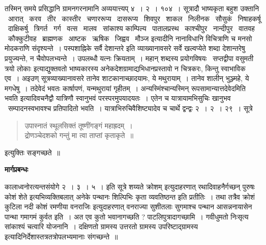 \documentclass[11pt, openany]{book}
\begin{document}
{तस्मिन् समये प्रसिद्धानि ग्रामनगरनामानि अव्ययात्त्यप् ४~। २~। १०४~। सूत्रादौ भाष्यकृता बहुश उक्तानि \textendash\ आरात् \textendash\ करव \textendash\ तीर \textendash\ कास्तीर \textendash\ चणाररूप्य \textendash\ दासरूप्य \textendash\ शिवपुर \textendash\ शाकल \textendash\ निलीनक \textendash\ सौसुकं \textendash\ निषाहकर्षू \textendash\ दाक्षिकर्षु \textendash\ त्रिगर्त \textendash\ गर्ग \textendash\ वत्स \textendash\ मालव \textendash\ सांकाश्य काम्पिल्य \textendash\ पातालप्रस्थ \textendash\ काश्चीपुर \textendash\ नान्दीपुर \textendash\ वातवह \textendash\ कौक्कुटीवह \textendash\ ब्राह्मणक \textendash\ आष्टक \textendash\ ऋषिक \textendash\ जिह्वव \textendash\ मौञ्ज इत्यादीनि नानाविधानि विचित्राणि च मनसो मोदकराणि संदृश्यन्ते~। पस्पशाह्निके {\qt सर्वै देशान्तरे} इति व्याख्यानावसरे सर्वे खल्वप्येते शब्दा देशान्तरेषु प्रयुज्यन्ते, न चैवोपलभ्यन्ते~। उपलब्धौ यत्नः क्रियताम्~। महान् शब्दस्य प्रयोगविषयः \textendash\ सप्तद्वीपा वसुमती त्रयो लोकाः} इत्याद्युक्तवतो भाष्यकारस्य अनेकदेशग्रामाद्यभिधानप्रस्तावो न चित्रकरः, किन्तु स्वाभाविक एव~। अइउण् सूत्रव्याख्यानावसरे {\qt तानेव शाटकानाच्छादयामः, ये मथुरायाम्~। तानेव शालीन् भुञ्ज्महे, ये मगधेषु~। तदेवेदं भवतः कार्षापणं, यन्मथुरायां गृहीतम्~। अन्यस्मिंश्चान्यस्मिन् रूपसामान्यात्तदेवेदमिति भवति} इत्यादिवचनैद्वौ यात्रिणौ स्वानुभवं परस्परमुपयादयतः~। एतेन च यात्रायामभिसुचिः खानुभव \textendash\ सम्पादनस्वभावश्च प्रतिपादितो भवति~। यात्राभिरुचिवैशिष्ट्यादेव च चार्थे द्वन्द्वः २~। २~। २९~। सूत्रे \textendash\

\begin{quote}
{\qt उपास्नातं स्थूलसिक्तं तूष्णींगङ्गं महाह्रदम्~।\\
द्रोणञ्चेदशको गन्तुं मा त्वा ताप्तां कृताकृते~॥}
\end{quote}

इत्युक्तिः सङ्गच्छते~॥ 

\begin{center}
\textbf{\Large मार्गप्रबन्धः \textendash\ }
\end{center}

कालाध्वनोरत्यन्तसंयोगे २~। ३~। ५~। इति सूत्रे {\qt शय्यते} क्रोशम् इत्युदाहरणात् रथादिवाहनैर्गच्छन् पुरुषः कोशं शेते इत्यभिव्यक्तिबलात् अनेके पन्थानः शिल्पिभिः कृता व्यवतिष्ठन्त इति प्रतीतिः~। तथा तत्रैव {\qt क्रोशं कुटिला नदी कोशं रमणीया वनराजिः} इत्युदाहरणात् वनराज्या सुशीतलाः सुगमाश्च पन्थान आसन्ननायासेन पान्था गमागमं कुर्वत इति~। अत एव {\qt कुतो भवानागच्छति ? पाटलिपुत्रादागच्छामि~।} गवीधुमतो निःसृत्य सांकाश्यं चत्वारि योजनानि~। दक्षिणतो ग्रामस्य उत्तरतो ग्रामस्य उपरिष्टाद्ग्रामस्य इत्यादिनिर्देशास्तत्रतत्रोपलभ्यमानाः संगच्छन्ते~॥\\
\end{document}
